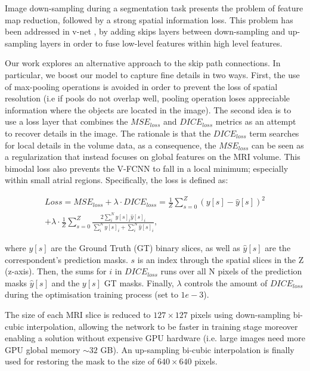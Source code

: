 \documentclass{llncs}
\begin{document}
Image down-sampling during a segmentation task 
presents the problem of feature map reduction, followed by a strong spatial information loss.
This problem has been addressed in v-net \cite{Fausto}, \cite{Isensee} by adding skips layers between down-sampling and up-sampling layers
in order to fuse low-level features within high level
features.

Our work explores an alternative approach to the skip path connections. In particular, we boost our model to capture fine details in two ways. 
First, the use of max-pooling operations is avoided in order to prevent the loss of spatial resolution (i.e if pools do not overlap well, pooling operation loses appreciable information where the objects are located in the image). The second idea is to use a loss layer that combines the $MSE_{loss}$ and $DICE_{loss}$ metrics as an attempt to recover details in the image. The rationale is that the $DICE_{loss}$ term searches for local details in the volume data, as a consequence, the $MSE_{loss}$ can be seen as a regularization that instead focuses on global features on the MRI volume. This bimodal loss also prevents the V-FCNN to fall in a local minimum; especially within small atrial regions. Specifically, the loss is defined as: 

\begin{equation}
\begin{split}
 Loss =  MSE_{loss} + \lambda\cdot DICE_{loss} =  \frac{1}{Z} \sum_{s=0}^{Z} (y[s]-\hat{y}[s])^{2} \\
  + \lambda\cdot  \frac{1}{Z} \sum_{s=0}^{Z} \frac{2\sum_{i}^{N} y[s]_{i}\hat{y}[s]_{i}}{\sum_{i}^{N} y[s]_{i} + \sum_{i}^{N} \hat{y}[s]_{i}},
\end{split}
\end{equation}

where $y[s]$ are the Ground Truth (GT) binary slices, as well as $\hat{y}[s]$ are the correspondent's prediction masks. $s$ is an index through the spatial slices in the Z (z-axis).
Then, the sums for $i$ in $DICE_{loss}$ runs over all N pixels of the prediction masks $\hat{y}[s]$ and the $y[s]$ GT masks. Finally, $\lambda$ controls the amount of $DICE_{loss}$ during the optimisation training process (set to $1e-3$). 

The size of each MRI slice is reduced to $127\times127$ pixels using down-sampling bi-cubic interpolation, allowing the network to be faster in training stage moreover enabling a solution without expensive GPU hardware (i.e. large images need more GPU global memory $\sim 32$ GB). An up-sampling bi-cubic interpolation is finally used for restoring the mask to the size of $640\times640$ pixels. 
\end{document}
